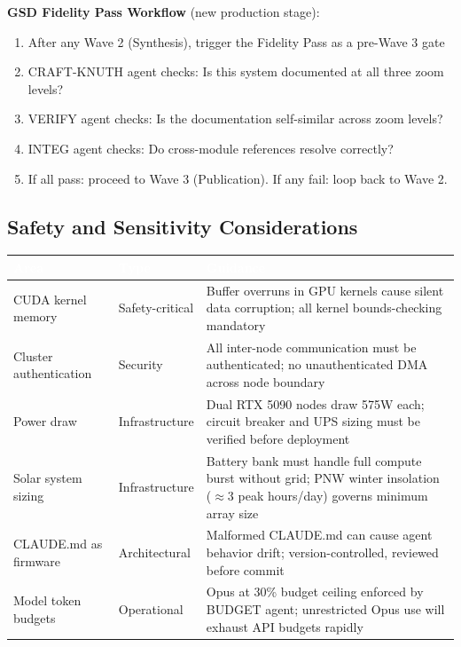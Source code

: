\documentclass[11pt,letterpaper]{article}
\newcommand{\tableheader}[1]{\textbf{\sffamily\textcolor{white}{#1}}}
\begin{document}
\textbf{GSD Fidelity Pass Workflow} (new production stage):
\begin{enumerate}
  \item After any Wave 2 (Synthesis), trigger the Fidelity Pass as a pre-Wave 3 gate
  \item CRAFT-KNUTH agent checks: Is this system documented at all three zoom levels?
  \item VERIFY agent checks: Is the documentation self-similar across zoom levels?
  \item INTEG agent checks: Do cross-module references resolve correctly?
  \item If all pass: proceed to Wave 3 (Publication). If any fail: loop back to Wave 2.
\end{enumerate}

\subsection{Safety and Sensitivity Considerations}

\begin{center}
\begin{tabularx}{\textwidth}{L{4cm}L{2.5cm}X}
\toprule
{}
\tableheader{Area} & \tableheader{Type} & \tableheader{Guidance} \\
\midrule
CUDA kernel memory & Safety-critical & Buffer overruns in GPU kernels cause silent data corruption; all kernel bounds-checking mandatory \\
Cluster authentication & Security & All inter-node communication must be authenticated; no unauthenticated DMA across node boundary \\
Power draw & Infrastructure & Dual RTX 5090 nodes draw 575W each; circuit breaker and UPS sizing must be verified before deployment \\
Solar system sizing & Infrastructure & Battery bank must handle full compute burst without grid; PNW winter insolation ($\approx$3 peak hours/day) governs minimum array size \\
CLAUDE.md as firmware & Architectural & Malformed CLAUDE.md can cause agent behavior drift; version-controlled, reviewed before commit \\
Model token budgets & Operational & Opus at 30\% budget ceiling enforced by BUDGET agent; unrestricted Opus use will exhaust API budgets rapidly \\
\bottomrule
\end{tabularx}
\end{center}
\end{document}
